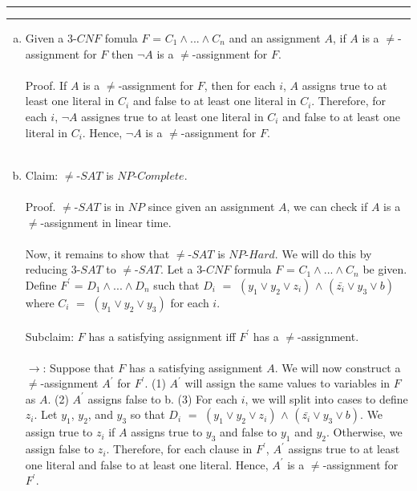 \documentclass[11pt]{article}
\newcounter{questionCounter}
\newcounter{partCounter}[questionCounter]
\newenvironment{question}[2][\arabic{questionCounter}]{%
    \setcounter{partCounter}{0}%
    \vspace{.25in} \hrule \vspace{0.5em}%
        \noindent{\bf #2}%
    \vspace{0.8em} \hrule \vspace{.10in}%
    \addtocounter{questionCounter}{1}%
}{}
\begin{document}
\newpage
\begin{question}{NP-Completeness}
\begin{enumerate}[(a)]
\item Given a $3$-$CNF$ fomula $F$ = $C_{1} \wedge ... \wedge C_{n}$ and an
assignment $A$, if $A$ is a $\neq$-assignment for $F$ then $\neg A$ is a
$\neq$-assignment for $F$.

\paragraph{}
Proof.  If $A$ is a $\neq$-assignment for $F$, then for each $i$, $A$ assigns true to at least one literal in $C_{i}$ and false to at least one literal in $C_{i}$.  Therefore, for each $i$, $\neg A$ assignes true to at least one literal in $C_{i}$ and false to at least one literal in $C_{i}$.  Hence, $\neg A$ is a $\neq$-assignment for $F$.
\\\\
\item Claim: $\neq$-$SAT$ is $NP$-$Complete$.
\paragraph{}
Proof.  $\neq$-$SAT$ is in $NP$ since given an assignment $A$, we can check if $A$ is a $\neq$-assignment in linear time.

\paragraph{}
Now, it remains to show that $\neq$-$SAT$ is $NP$-$Hard$.  We will do this by reducing $3$-$SAT$ to $\neq$-$SAT$.  Let a $3$-$CNF$ formula $F$ = $C_{1} \wedge ... \wedge C_{n}$ be given.  Define $F^{\prime}$ = $D_{1} \wedge ... \wedge D_{n}$ such that $D_{i}$ $=$ $(y_{1} \vee y_{2} \vee z_{i})$ $\wedge$ $(\bar{z_{i}} \vee y_{3} \vee b)$ where $C_{i}$ $=$ $(y_{1} \vee y_{2} \vee y_{3})$ for each $i$.

\paragraph{}
Subclaim: $F$ has a satisfying assignment iff $F^{\prime}$ has a $\neq$-assignment.

\paragraph{}
$\rightarrow$:  Suppose that $F$ has a satisfying assignment $A$.  We will now construct a $\neq$-assignment $A^{\prime}$ for $F^{\prime}$.  (1) $A^{\prime}$ will assign the same values to variables in $F$ as $A$.  (2) $A^{\prime}$ assigns false to b.  (3) For each $i$, we will split into cases to define $z_{i}$.  Let $y_{1}$, $y_{2}$, and $y_{3}$ so that $D_{i}$ $=$ $(y_{1} \vee y_{2} \vee z_{i})$ $\wedge$ $(\bar{z_{i}} \vee y_{3} \vee b)$.  We assign true to $z_{i}$ if $A$ assigns true to $y_{3}$ and false to $y_{1}$ and $y_{2}$.  Otherwise, we assign false to $z_{i}$.  Therefore, for each clause in $F^{\prime}$, $A^{\prime}$ assigns true to at least one literal and false to at least one literal.  Hence, $A^{\prime}$ is a $\neq$-assignment for $F^{\prime}$.


\end{enumerate}
\end{question}
\end{document}
